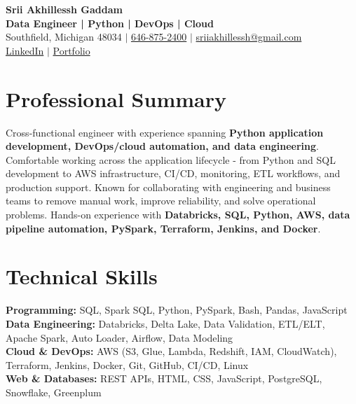 \documentclass[letterpaper,10pt]{article}
\begin{document}
\fontsize{9.35pt}{10.45pt}\selectfont

\begin{center}
    {\LARGE \textbf{Srii Akhillessh Gaddam}} \\[-1pt]
    \textbf{Data Engineer | Python | DevOps | Cloud} \\[2pt]
    Southfield, Michigan 48034 $|$
    \href{tel:6468752400}{646-875-2400} $|$
    \href{mailto:sriiakhillessh@gmail.com}{sriiakhillessh@gmail.com} \\[1pt]
    \href{https://www.linkedin.com/in/srii-akhiilessh-gaddam-b48668191/}{LinkedIn} $|$
    \href{https://sriiakhillesshg.github.io/portfolio/}{Portfolio}
\end{center}
\vspace{-8pt}

\section{Professional Summary}
\small{Cross-functional engineer with experience spanning \textbf{Python application development, DevOps/cloud automation, and data engineering}. Comfortable working across the application lifecycle - from Python and SQL development to AWS infrastructure, CI/CD, monitoring, ETL workflows, and production support. Known for collaborating with engineering and business teams to remove manual work, improve reliability, and solve operational problems. Hands-on experience with \textbf{Databricks, SQL, Python, AWS, data pipeline automation, PySpark, Terraform, Jenkins, and Docker}.}

\section{Technical Skills}
\small{
\textbf{Programming:} SQL, Spark SQL, Python, PySpark, Bash, Pandas, JavaScript \\
\textbf{Data Engineering:} Databricks, Delta Lake, Data Validation, ETL/ELT, Apache Spark, Auto Loader, Airflow, Data Modeling \\
\textbf{Cloud \& DevOps:} AWS (S3, Glue, Lambda, Redshift, IAM, CloudWatch), Terraform, Jenkins, Docker, Git, GitHub, CI/CD, Linux \\
\textbf{Web \& Databases:} REST APIs, HTML, CSS, JavaScript, PostgreSQL, Snowflake, Greenplum
}

\end{document}
